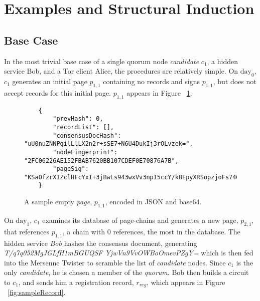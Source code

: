 \section{Examples and Structural Induction}

\subsection{Base Case}

In the most trivial base case of a single quorum node \emph{candidate} $ c_{1} $, a hidden service Bob, and a Tor client Alice, the procedures are relatively simple. On $ \textrm{day}_{0} $, $ c_{1} $ generates an initial page $ p_{1,1} $ containing no records and signs $ p_{1,1} $, but does not accept records for this initial page. $ p_{1,1} $ appears in Figure ~\ref{fig:emptyPage}.

\begin{figure}
	\begin{lstlisting}
	{
		"prevHash": 0,
		"recordList": [],
		"consensusDocHash": "uU0nuZNNPgilLlLX2n2r+sSE7+N6U4DukIj3rOLvzek=",
		"nodeFingerprint": "2FC06226AE152FBAB7620BB107CDEF0E70876A7B",
		"pageSig": "KSaOfzrXIZclHFcYxI+3jBwLs943wxVv3npI5ccY/kBEpyXRSopzjoFs746n0tJqUpdY4Kbe6DBwERaN7ELmSSK9Pu6q8QeKzNAh+QOnKl0fKBN7fqowjkQ3ktFkR0Vuox9WrrbNTMa4+up0Np52hlbKA3zSRz4fbR9NVlh6uuQ="
	}
	\end{lstlisting}
	\caption{A sample empty \emph{page}, $ p_{1,1} $, encoded in JSON and base64.}
	\label{fig:emptyPage}
\end{figure}

On $ \textrm{day}_{1} $, $ c_{1} $ examines its database of page-chains and generates a new page, $ p_{2,1} $, that references $ p_{1,1} $, a chain with 0 references, the most in the database. The hidden service \emph{Bob} hashes the consensus document, generating \emph{T/q7q052MgJGLfH1mBGUQSF YjwVn9VvOWBoOmevPZgY=} which is then fed into the Mersenne Twister to scramble the list of \emph{candidate} nodes. Since $ c_{1} $ is the only \emph{candidate}, he is chosen a member of the \emph{quorum}. Bob then builds a circuit to $ c_{1} $, and sends him a registration record, $ r_{reg} $, which appears in Figure ~\ref{fig:sampleRecord}. 

